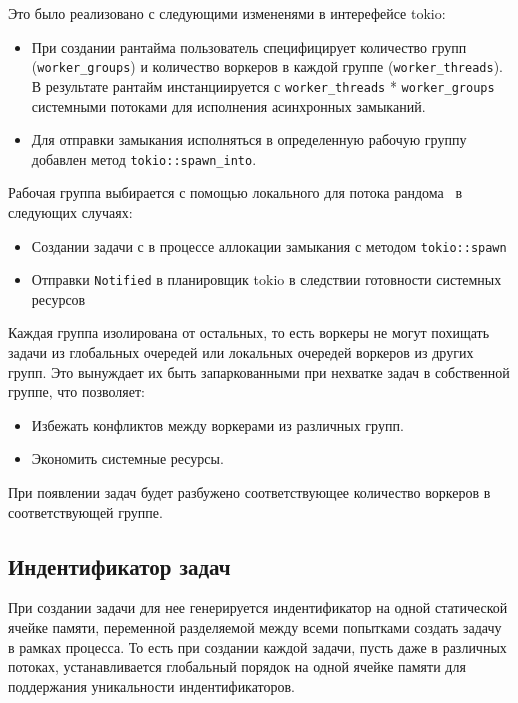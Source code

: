 Это было реализовано с следующими измененями в интерефейсе tokio:

\begin{itemize}

\item При создании рантайма пользователь специфицирует количество групп (\verb|worker_groups|) и количество воркеров в каждой группе (\verb|worker_threads|). В результате рантайм инстанциируется с \verb|worker_threads| * \verb|worker_groups| системными потоками для исполнения асинхронных замыканий.
\item Для отправки замыкания исполняться в определенную рабочую группу добавлен метод \verb|tokio::spawn_into|.
\end{itemize}


Рабочая группа выбирается с помощью локального для потока рандома~\cite{xorshiftRNG} в следующих случаях:

\begin{itemize}
    \item Создании задачи с в процессе аллокации замыкания с методом \verb|tokio::spawn|
    \item Отправки \verb|Notified| в планировщик tokio в следствии готовности системных ресурсов
\end{itemize}

Каждая группа изолирована от остальных, то есть воркеры не могут похищать задачи из глобальных очередей или локальных очередей воркеров из других групп. Это вынуждает их быть запаркованными при нехватке задач в собственной группе, что позволяет:

\begin{itemize}
    \item Избежать конфликтов между воркерами из различных групп.
    \item Экономить системные ресурсы.
\end{itemize}

При появлении задач будет разбужено соответствующее количество воркеров в соответствующей группе.

\subsection{Индентификатор задач}

При создании задачи для нее генерируется индентификатор на одной статической ячейке памяти, переменной разделяемой между всеми попытками создать задачу в рамках процесса. То есть при создании каждой задачи, пусть даже в различных потоках, устанавливается глобальный порядок на одной ячейке памяти для поддержания уникальности индентификаторов.

